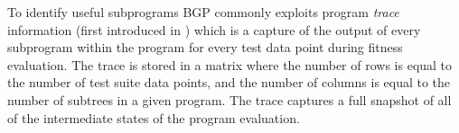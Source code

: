 To identify useful subprograms BGP commonly exploits program \textit{trace} information (first introduced in ) which is a capture of the output of every subprogram within the program for every test data point during fitness evaluation.  %
%
%
The trace is stored in a matrix where the number of rows is equal to the number of test suite data points, and the number of columns is equal to the number of subtrees in a given program. %
The trace captures a full snapshot of all of the intermediate states of the program evaluation. 

